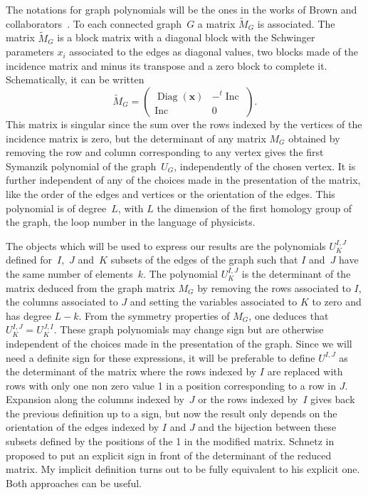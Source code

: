 \documentclass[11pt]{article}
\numberwithin{equation}{section}
\begin{document}
The notations for graph polynomials will be the ones in the works of
Brown and collabora\-tors~\cite{Br2009,BrYe09}. To each connected graph~$G$ a matrix $\tilde M_G$ is associated.
The matrix $\tilde M_G$ is a block
matrix with a diagonal block with the Schwinger parameters $x_i$ associated to the edges as diagonal values, two
blocks made of the incidence matrix and minus its transpose and a zero block to complete it. Schematically, it can be written
\begin{equation*}
	\tilde M_G = \begin{pmatrix}
		\operatorname{Diag}(\mathbf{x}) & -{}^t \operatorname{Inc} \\ \operatorname{Inc} & 0
	\end{pmatrix}.
\end{equation*}
This matrix is singular since the sum over the rows indexed by the vertices of the incidence matrix is zero, but the
determinant of any matrix $M_G$ obtained by removing the row and column corresponding to any vertex gives the first
Symanzik polynomial of the graph~$U_G$, independently of the chosen vertex. It is further independent of any of the choices made in the
presentation of the matrix, like the order of the edges and vertices or the orientation of the edges. This polynomial is of degree~$L$, with
$L$ the dimension of the first homology group of the graph, the loop number in the language of physicists.

The objects which will be used to express our results are the polynomials
$U^{I ,J}_K$ defined for~$I$,~$J$ and~$K$ subsets of the edges of the graph
such that $I$ and~$J$ have the same number of elements~$k$. The polynomial
$U^{I ,J}_K$ is the determinant of the matrix deduced from the graph matrix $M_G$ by
removing the rows associated to $I$, the columns associated to $J$ and setting
the variables associated to $K$ to zero and has degree $L-k$. From the symmetry properties of $M_G$,
one deduces that $U^{I ,J}_K = U^{J,I}_K$. These graph polynomials may change sign but are otherwise independent of
the choices made in the presentation of the graph. Since
we will need a definite sign for these expressions, it will be preferable to define
$U^{I ,J}$ as the determinant of the matrix where the rows indexed by $I$ are
replaced with rows with only one non zero value 1 in a position corresponding to a row in
$J$. Expansion along the columns indexed by~$J$ or the rows indexed by~$I$ gives back the previous definition up to
a sign, but now the result only depends on the orientation of the edges indexed by
$I$ and $J $ and the bijection between these subsets
defined by the positions of the 1 in the modified matrix. Schnetz in~\cite{SC2021} proposed to put
an explicit sign in front of the determinant of the reduced matrix. My implicit definition turns out to be fully equivalent to his
explicit one. Both approaches can be useful.
\end{document}
